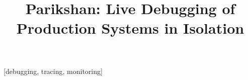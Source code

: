 \documentclass{sig-alternate}
\begin{document}

\title{\Large \bf Parikshan\xspace: Live Debugging of Production Systems in Isolation}


\maketitle


\newcommand{\iprobe}{\texttt{iProbe}\xspace}
\newcommand{\parikshan}{\texttt{Parikshan}\xspace}
\newcommand{\livedebugging}{\textit{live debugging}\xspace}
\newcommand{\debugcontainer}{\textit{debug container}\xspace}
\newtheorem{example}{Example}
\def\infinity{\rotatebox{90}{8}}



\vspace{-2pt}
[debugging, tracing, monitoring]

\vspace{-2mm}


%
%


%
%





%


\pagebreak
%
%






\end{document}
